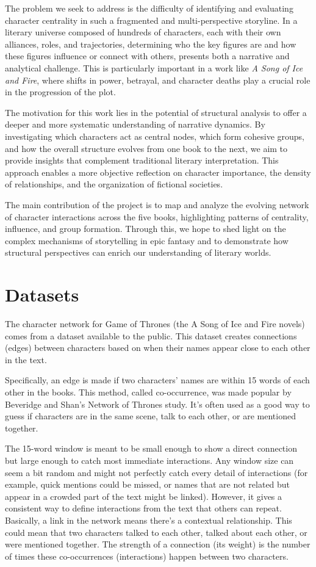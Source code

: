 \documentclass[12pt, a4paper]{article}
\begin{document}
The problem we seek to address is the difficulty of identifying and evaluating character centrality in such a fragmented and multi-perspective storyline. In a literary universe composed of hundreds of characters, each with their own alliances, roles, and trajectories, determining who the key figures are and how these figures influence or connect with others, presents both a narrative and analytical challenge. This is particularly important in a work like \textit{A Song of Ice and Fire}, where shifts in power, betrayal, and character deaths play a crucial role in the progression of the plot.

The motivation for this work lies in the potential of structural analysis to offer a deeper and more systematic understanding of narrative dynamics. By investigating which characters act as central nodes, which form cohesive groups, and how the overall structure evolves from one book to the next, we aim to provide insights that complement traditional literary interpretation. This approach enables a more objective reflection on character importance, the density of relationships, and the organization of fictional societies.

The main contribution of the project is to map and analyze the evolving network of character interactions across the five books, highlighting patterns of centrality, influence, and group formation. Through this, we hope to shed light on the complex mechanisms of storytelling in epic fantasy and to demonstrate how structural perspectives can enrich our understanding of literary worlds.
\section{Datasets}
\label{datasets}

The character network for Game of Thrones (the A Song of Ice and Fire novels) comes from a dataset available to the public. 
This dataset creates connections (edges) between characters based on when their names appear close to each other in the text. 

Specifically, an edge is made if two characters' names are within 15 words of each other in the books. 
This method, called co-occurrence, was made popular by Beveridge and Shan's Network of Thrones study. 
It's often used as a good way to guess if characters are in the same scene, talk to each other, or are mentioned together. 

The 15-word window is meant to be small enough to show a direct connection but large enough to catch most immediate interactions. Any window size can seem a bit random and might not perfectly catch every detail of interactions (for example, quick mentions could be missed, or names that are not related but appear in a crowded part of the text might be linked). However, it gives a consistent way to define interactions from the text that others can repeat. Basically, a link in the network means there's a contextual relationship. This could mean that two characters talked to each other, talked about each other, or were mentioned together. The strength of a connection (its weight) is the number of times these co-occurrences (interactions) happen between two characters. 
\end{document}

